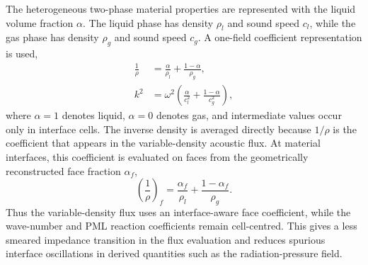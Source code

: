 \documentclass[final,num,12pt]{elsarticle}
\begin{document}
The heterogeneous two-phase material properties are represented with the liquid
volume fraction $\alpha$.  The liquid phase has density $\rho_l$ and sound speed
$c_l$, while the gas phase has density $\rho_g$ and sound speed $c_g$.  A
one-field coefficient representation is used,
\begin{equation}
    \begin{aligned}
           \frac{1}{\rho}& = \frac{\alpha}{\rho_l} + \frac{1-\alpha}{\rho_g},  \\
           k^2 &= \omega^2\left(\frac{\alpha}{c_l^2}+\frac{1-\alpha}{c_g^2}\right),
    \end{aligned}
\label{eq:twoPhaseCoefficients}
\end{equation}
where $\alpha=1$ denotes liquid, $\alpha=0$ denotes gas, and intermediate values
occur only in interface cells.  The inverse density is averaged directly because
$1/\rho$ is the coefficient that appears in the variable-density acoustic flux.
At material interfaces, this coefficient is evaluated on faces from the
geometrically reconstructed face fraction $\alpha_f$,
\begin{equation}
    \left(\frac{1}{\rho}\right)_f
    = \frac{\alpha_f}{\rho_l}+\frac{1-\alpha_f}{\rho_g}.
\label{eq:faceInverseDensity}
\end{equation}
Thus the variable-density flux uses an interface-aware face coefficient, while
the wave-number and PML reaction coefficients remain cell-centred.  This gives a
less smeared impedance transition in the flux evaluation and reduces spurious
interface oscillations in derived quantities such as the radiation-pressure
field.
\end{document}
